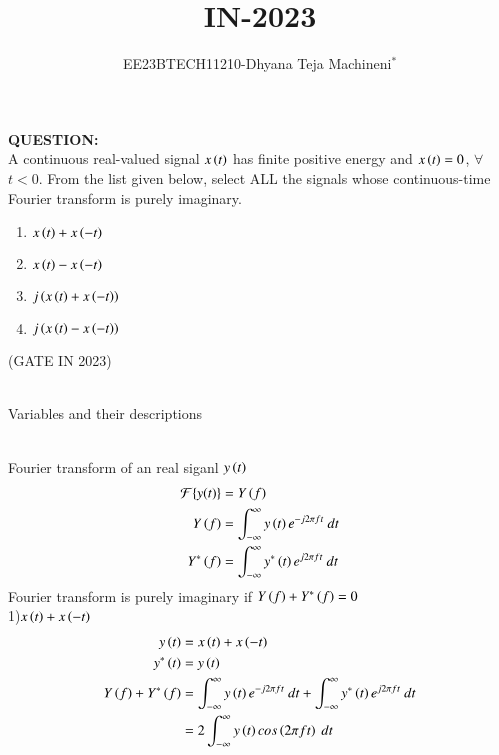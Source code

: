 \documentclass[journal,12pt,twocolumn]{IEEEtran}
\theoremstyle{remark}
\begin{document}

\vspace{3cm}
\title{\textbf{IN-2023}}
\author{EE23BTECH11210-Dhyana Teja Machineni$^{*}$%
}
\maketitle
\newpage
\bigskip

\textbf{QUESTION:}\\
A continuous real-valued signal $x\left(t\right)$ has finite positive energy and $x\left(t\right) = 0$, $\forall$ $t < 0$. From the list given below, select ALL the signals whose
continuous-time Fourier transform is purely imaginary.\\
\begin{enumerate}
\item$x\left(t\right) + x\left(-t\right)$
\item$x\left(t\right) - x\left(-t\right)$
\item$j\left(x\left(t\right) + x\left(-t\right)\right)$
\item$j\left(x\left(t\right) - x\left(-t\right)\right)$
\end{enumerate}
\hfill{(GATE IN 2023)}\\
\solution\\
\begin{table}[h]
         \label{tab:table}
         
         \caption{Variables and their descriptions}
     \end{table}\\
Fourier transform of an real siganl $y\left(t\right)$\\
\begin{align}
\mathcal{F}\{y(t)\} &= Y\left(f\right)\\
Y\left(f\right)&=\int_{-\infty}^{\infty} y\left(t\right) e^{-j 2\pi f t} \ dt\\
Y^*\left(f\right)&=\int_{-\infty}^{\infty} y^*\left(t\right) e^{j 2\pi f t} \ dt
\end{align}
Fourier transform is purely imaginary if $Y\left(f\right)+Y^*\left(f\right)=0$\\
1)$x\left(t\right) + x\left(-t\right)$\\
\begin{align}
 y\left(t\right)&=x\left(t\right) + x\left(-t\right)\\
 y^*\left(t\right)&=y\left(t\right)\\
 Y\left(f\right)+Y^*\left(f\right)&=\int_{-\infty}^{\infty} y\left(t\right) e^{-j 2\pi f t} \ dt+\int_{-\infty}^{\infty} y^*\left(t\right) e^{j 2\pi f t} \ dt\\
 &=2\int_{-\infty}^{\infty} y\left(t\right) cos\left(2 \pi ft\right) \ dt
\end{align}
\end{document}
